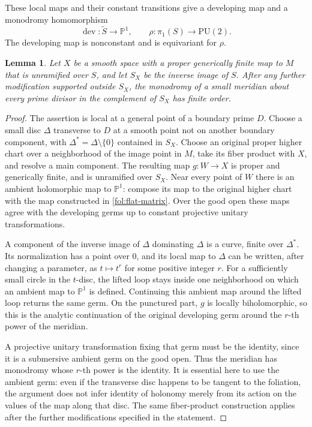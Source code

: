 \documentclass[11pt,letterpaper]{article}
\newcommand{\PP}{\mathbb{P}}
\newtheorem{lemma}[theorem]{Lemma}
\theoremstyle{definition}
\theoremstyle{remark}
\begin{document}
These local maps and their constant transitions give a developing map
and a monodromy homomorphism
\begin{equation}\label{fol:developing-map}
 \operatorname{dev}\colon\widetilde S\to\PP^1,\qquad
 \rho\colon\pi_1(S)\to\mathrm{PU}(2).
\end{equation}
The developing map is nonconstant and is equivariant for $\rho$.

\begin{lemma}\label{fol:finite-meridians}
Let $X$ be a smooth space with a proper generically finite map to $M$
that is unramified over $S$, and let $S_X$ be the inverse image of $S$.
After any further modification supported outside $S_X$, the monodromy
of a small meridian about every prime divisor in the complement of
$S_X$ has finite order.
\end{lemma}

\begin{proof}
The assertion is local at a general point of a boundary prime $D$.
Choose a small disc $\Delta$ transverse to $D$ at a smooth point not
on another boundary component, with $\Delta^*=\Delta\setminus\{0\}$
contained in $S_X$.  Choose an original proper higher chart over a
neighborhood of the image point in $M$, take its fiber product with
$X$, and resolve a main component.  The resulting map
$g\colon W\to X$ is proper and generically finite, and is unramified
over $S_X$.  Near every point of $W$ there is an ambient holomorphic
map to $\PP^1$: compose its map to the original higher chart with the
map constructed in \eqref{fol:flat-matrix}.  Over the good open these
maps agree with the developing germs up to constant projective
unitary transformations.

A component of the inverse image of $\Delta$ dominating $\Delta$
is a curve, finite over $\Delta^*$.  Its normalization has a point over
$0$, and its local map to $\Delta$ can be written, after changing a
parameter, as $t\mapsto t^r$ for some positive integer $r$.
For a sufficiently small circle in the $t$-disc, the lifted loop stays
inside one neighborhood on which an ambient map to $\PP^1$ is
defined.  Continuing this ambient map around the lifted loop returns
the same germ.  On the punctured part, $g$ is locally biholomorphic,
so this is the analytic continuation of the original developing germ
around the $r$-th power of the meridian.

A projective unitary transformation fixing that germ must be the
identity, since it is a submersive ambient germ on the good open.
Thus the meridian has monodromy whose $r$-th power is the identity.
It is essential here to use the ambient germ: even if the transverse
disc happens to be tangent to the foliation, the argument does not
infer identity of holonomy merely from its action on the values of
the map along that disc.  The same fiber-product construction applies
after the further modifications specified in the statement.
\end{proof}
\end{document}
